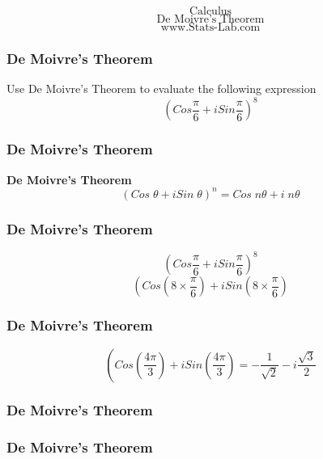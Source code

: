 \documentclass{beamer}
\begin{document}
\begin{frame}


{
\huge
\[ \mbox{Calculus} \]
\[ \mbox{De Moivre's Theorem} \]
}
{
\Large
\[ \mbox{www.Stats-Lab.com} \]
}
\end{frame}

\begin{frame}
\frametitle{De Moivre's Theorem}
\Large
\vspace{-2cm}
Use De Moivre's Theorem to evaluate the following expression
\[\left( Cos \frac{\pi}{6} + i Sin\frac{\pi}{6} \right)^8\]

\end{frame}
\begin{frame}
\frametitle{De Moivre's Theorem}
\Large
\vspace{-2cm}
\textbf{De Moivre's Theorem}
\[(Cos\; \theta + i Sin\; \theta)^n = Cos\; n\theta + i \; n \theta \]
\end{frame}
\begin{frame}
\frametitle{De Moivre's Theorem}
\Large
\[\left( Cos \frac{\pi}{6} + i Sin\frac{\pi}{6} \right)^8\]
\[\left( Cos \left(8 \times \frac{\pi}{6} \right)+ i Sin \left(8 \times \frac{\pi}{6} \right)\]

\end{frame}
\begin{frame}
\frametitle{De Moivre's Theorem}
\Large

\[\left( Cos \left(\frac{4\pi}{3} \right)+ i Sin \left(\frac{4\pi}{3} \right) = -\frac{1}{\sqrt{2}} - i\frac{\sqrt{3}}{2} \]
\end{frame}
\begin{frame}
\frametitle{De Moivre's Theorem}
\Large

\end{frame}
\begin{frame}
\frametitle{De Moivre's Theorem}
\Large

\end{frame}
\end{document}
